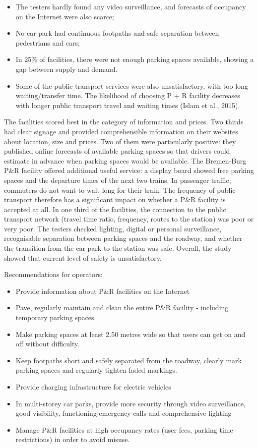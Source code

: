 \documentclass[
]{book}
\providecommand{\tightlist}{%
  \setlength{\itemsep}{0pt}\setlength{\parskip}{0pt}}
\begin{document}
\begin{itemize}
\tightlist
\item
  The testers hardly found any video surveillance, and forecasts of occupancy on the Internet were also scarce;
\item
  No car park had continuous footpaths and safe separation between pedestrians and cars;
\item
  In 25\% of facilities, there were not enough parking spaces available, showing a gap between supply and demand.
\item
  Some of the public transport services were also unsatisfactory, with too long waiting/transfer time. The likelihood of choosing P + R facility decreases with longer public transport travel and waiting times (Islam et al., 2015).
\end{itemize}

The facilities scored best in the category of information and prices. Two thirds had clear signage and provided comprehensible information on their websites about location, size and prices. Two of them were particularly positive: they published online forecasts of available parking spaces so that drivers could estimate in advance when parking spaces would be available. The Bremen-Burg P\&R facility offered additional useful service: a display board showed free parking spaces and the departure times of the next two trains.
In passenger traffic, commuters do not want to wait long for their train. The frequency of public transport therefore has a significant impact on whether a P\&R facility is accepted at all. In one third of the facilities, the connection to the public transport network (travel time ratio, frequency, routes to the station) was poor or very poor.
The testers checked lighting, digital or personal surveillance, recognisable separation between parking spaces and the roadway, and whether the transition from the car park to the station was safe. Overall, the study showed that current level of safety is unsatisfactory.

Recommendations for operators:

\begin{itemize}
\tightlist
\item
  Provide information about P\&R facilities on the Internet
\item
  Pave, regularly maintain and clean the entire P\&R facility - including temporary parking spaces.
\item
  Make parking spaces at least 2.50 metres wide so that users can get on and off without difficulty.
\item
  Keep footpaths short and safely separated from the roadway, clearly mark parking spaces and regularly tighten faded markings.
\item
  Provide charging infrastructure for electric vehicles
\item
  In multi-storey car parks, provide more security through video surveillance, good visibility, functioning emergency calls and comprehensive lighting
\item
  Manage P\&R facilities at high occupancy rates (user fees, parking time restrictions) in order to avoid misuse.
\end{itemize}
\end{document}
